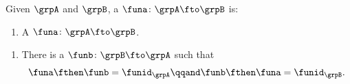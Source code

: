 \begin{ctdefinition}
    \label{def:group-isomorphism}
    Given  $\grpA$ and $\grpB$, a  $\funa\colon \grpA \fto \grpB$ is:

    \constit
    \begin{enumerate}
        \item A  $\funa\colon \grpA \fto \grpB$.
    \end{enumerate}

    \condit
    \begin{enumerate}
        \item There is a  $\funb\colon \grpB \fto \grpA$ such that
              \begin{equation}
                  \funa \fthen \funb = \funid_\grpA \qqand \funb \fthen \funa = \funid_\grpB.
              \end{equation}
    \end{enumerate}
\end{ctdefinition}

